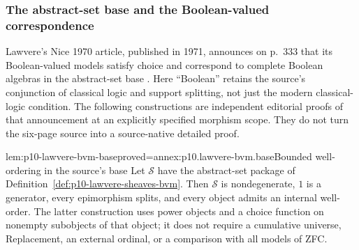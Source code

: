 \subsubsection{The abstract-set base and the Boolean-valued correspondence}

Lawvere's Nice 1970 article, published in 1971, announces on p.~333
that its Boolean-valued models satisfy choice and correspond to complete
Boolean algebras in the abstract-set base \cite[p.~333]{Lawvere1970}.
Here ``Boolean'' retains the source's conjunction of classical logic and
support splitting, not just the modern classical-logic condition.
The following constructions are independent editorial proofs of that
announcement at an explicitly specified morphism scope. They do not turn
the six-page source into a source-native detailed proof.

\begin{hblemma}{lem:p10-lawvere-bvm-base}{proved=annex:p10.lawvere-bvm.base}{Bounded well-ordering in the source's base}
Let \(\mathcal S\) have the abstract-set package of
Definition~\ref{def:p10-lawvere-sheaves-bvm}. Then \(\mathcal S\)
is nondegenerate, \(1\) is a generator, every epimorphism splits,
and every object admits an internal well-order. The latter construction
uses power objects and a choice function on nonempty subobjects of that
object; it does not require a cumulative universe, Replacement, an
external ordinal, or a comparison with all models of ZFC.
\end{hblemma}


